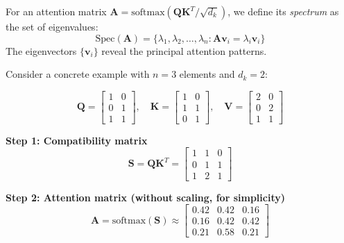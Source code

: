 \begin{definition}\label{def:attention_spectrum}
    For an attention matrix $\mathbf{A} = \text{softmax}(\mathbf{Q}\mathbf{K}^T/\sqrt{d_k})$, we define its \textit{spectrum} as the set of eigenvalues:
    \begin{equation}
        \text{Spec}(\mathbf{A}) = \{\lambda_1, \lambda_2, \ldots, \lambda_n : \mathbf{A}\mathbf{v}_i = \lambda_i \mathbf{v}_i\}
        \label{eq:attention_spectrum}
    \end{equation}
    The eigenvectors $\{\mathbf{v}_i\}$ reveal the principal attention patterns.
\end{definition}

\begin{example}\label{ex:explicit_3x3_attention}
    Consider a concrete example with $n=3$ elements and $d_k=2$:

    \begin{equation}
        \mathbf{Q} = \begin{bmatrix} 1 & 0 \\ 0 & 1 \\ 1 & 1 \end{bmatrix}, \quad
        \mathbf{K} = \begin{bmatrix} 1 & 0 \\ 1 & 1 \\ 0 & 1 \end{bmatrix}, \quad
        \mathbf{V} = \begin{bmatrix} 2 & 0 \\ 0 & 2 \\ 1 & 1 \end{bmatrix}
    \end{equation}

    \textbf{Step 1: Compatibility matrix}
    \begin{equation}
        \mathbf{S} = \mathbf{Q}\mathbf{K}^T = \begin{bmatrix} 1 & 1 & 0 \\ 0 & 1 & 1 \\ 1 & 2 & 1 \end{bmatrix}
    \end{equation}

    \textbf{Step 2: Attention matrix (without scaling, for simplicity)}
    \begin{equation}
        \mathbf{A} = \text{softmax}(\mathbf{S}) \approx \begin{bmatrix} 0.42 & 0.42 & 0.16 \\ 0.16 & 0.42 & 0.42 \\ 0.21 & 0.58 & 0.21 \end{bmatrix}
    \end{equation}


\end{example}
